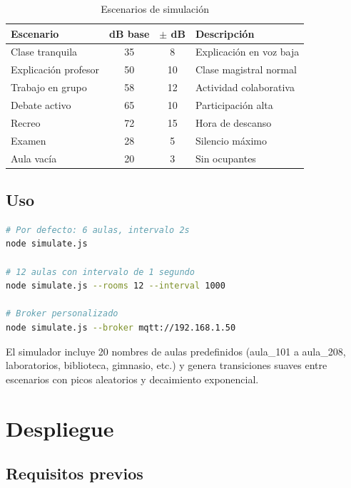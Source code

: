 \documentclass[12pt,a4paper]{report}
\begin{document}
\begin{table}[H]
\centering
\begin{tabularx}{\textwidth}{lccX}
\toprule
\textbf{Escenario} & \textbf{dB base} & \textbf{$\pm$ dB} & \textbf{Descripci\'on} \\
\midrule
Clase tranquila & 35 & 8 & Explicaci\'on en voz baja \\
Explicaci\'on profesor & 50 & 10 & Clase magistral normal \\
Trabajo en grupo & 58 & 12 & Actividad colaborativa \\
Debate activo & 65 & 10 & Participaci\'on alta \\
Recreo & 72 & 15 & Hora de descanso \\
Examen & 28 & 5 & Silencio m\'aximo \\
Aula vac\'ia & 20 & 3 & Sin ocupantes \\
\bottomrule
\end{tabularx}
\caption{Escenarios de simulaci\'on}
\end{table}

\section{Uso}

\begin{lstlisting}[language=bash, caption={Ejecuci\'on del simulador}]
# Por defecto: 6 aulas, intervalo 2s
node simulate.js

# 12 aulas con intervalo de 1 segundo
node simulate.js --rooms 12 --interval 1000

# Broker personalizado
node simulate.js --broker mqtt://192.168.1.50
\end{lstlisting}

El simulador incluye 20 nombres de aulas predefinidos (aula\_101 a aula\_208, laboratorios, biblioteca, gimnasio, etc.) y genera transiciones suaves entre escenarios con picos aleatorios y decaimiento exponencial.

\chapter{Despliegue}

\section{Requisitos previos}
\end{document}
